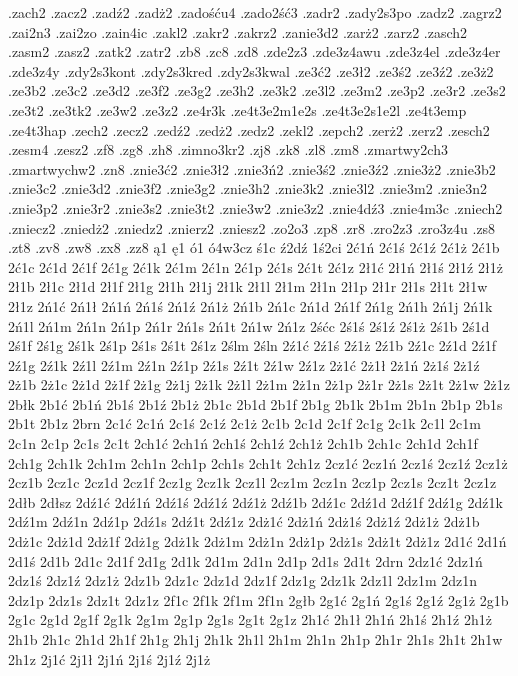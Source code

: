 {.zach2
.zacz2
.zadź2
.zadż2
.zadośću4
.zado2ść3
.zadr2
.zady2s3po
.zadz2
.zagrz2
.zai2n3
.zai2zo
.zain4ic
.zakl2
.zakr2
.zakrz2
.zanie3d2
.zarż2
.zarz2
.zasch2
.zasm2
.zasz2
.zatk2
.zatr2
.zb8
.zc8
.zd8
.zde2z3
.zde3z4awu
.zde3z4el
.zde3z4er
.zde3z4y
.zdy2s3kont
.zdy2s3kred
.zdy2s3kwal
.ze3ć2
.ze3ł2
.ze3ś2
.ze3ź2
.ze3ż2
.ze3b2
.ze3c2
.ze3d2
.ze3f2
.ze3g2
.ze3h2
.ze3k2
.ze3l2
.ze3m2
.ze3p2
.ze3r2
.ze3s2
.ze3t2
.ze3tk2
.ze3w2
.ze3z2
.ze4r3k
.ze4t3e2m1e2s
.ze4t3e2s1e2l
.ze4t3emp
.ze4t3hap
.zech2
.zecz2
.zedź2
.zedż2
.zedz2
.zekl2
.zepch2
.zerż2
.zerz2
.zesch2
.zesm4
.zesz2
.zf8
.zg8
.zh8
.zimno3kr2
.zj8
.zk8
.zl8
.zm8
.zmartwy2ch3
.zmartwychw2
.zn8
.znie3ć2
.znie3ł2
.znie3ń2
.znie3ś2
.znie3ź2
.znie3ż2
.znie3b2
.znie3c2
.znie3d2
.znie3f2
.znie3g2
.znie3h2
.znie3k2
.znie3l2
.znie3m2
.znie3n2
.znie3p2
.znie3r2
.znie3s2
.znie3t2
.znie3w2
.znie3z2
.znie4dź3
.znie4m3c
.zniech2
.zniecz2
.zniedż2
.zniedz2
.znierz2
.zniesz2
.zo2o3
.zp8
.zr8
.zro2z3
.zro3z4u
.zs8
.zt8
.zv8
.zw8
.zx8
.zz8
ą1
ę1
ó1
ó4w3cz
ś1c
ź2dź
1ś2ci
2ć1ń
2ć1ś
2ć1ź
2ć1ż
2ć1b
2ć1c
2ć1d
2ć1f
2ć1g
2ć1k
2ć1m
2ć1n
2ć1p
2ć1s
2ć1t
2ć1z
2ł1ć
2ł1ń
2ł1ś
2ł1ź
2ł1ż
2ł1b
2ł1c
2ł1d
2ł1f
2ł1g
2ł1h
2ł1j
2ł1k
2ł1l
2ł1m
2ł1n
2ł1p
2ł1r
2ł1s
2ł1t
2ł1w
2ł1z
2ń1ć
2ń1ł
2ń1ń
2ń1ś
2ń1ź
2ń1ż
2ń1b
2ń1c
2ń1d
2ń1f
2ń1g
2ń1h
2ń1j
2ń1k
2ń1l
2ń1m
2ń1n
2ń1p
2ń1r
2ń1s
2ń1t
2ń1w
2ń1z
2śćc
2ś1ś
2ś1ź
2ś1ż
2ś1b
2ś1d
2ś1f
2ś1g
2ś1k
2ś1p
2ś1s
2ś1t
2ś1z
2ślm
2śln
2ź1ć
2ź1ś
2ź1ż
2ź1b
2ź1c
2ź1d
2ź1f
2ź1g
2ź1k
2ź1l
2ź1m
2ź1n
2ź1p
2ź1s
2ź1t
2ź1w
2ź1z
2ż1ć
2ż1ł
2ż1ń
2ż1ś
2ż1ź
2ż1b
2ż1c
2ż1d
2ż1f
2ż1g
2ż1j
2ż1k
2ż1l
2ż1m
2ż1n
2ż1p
2ż1r
2ż1s
2ż1t
2ż1w
2ż1z
2błk
2b1ć
2b1ń
2b1ś
2b1ź
2b1ż
2b1c
2b1d
2b1f
2b1g
2b1k
2b1m
2b1n
2b1p
2b1s
2b1t
2b1z
2brn
2c1ć
2c1ń
2c1ś
2c1ź
2c1ż
2c1b
2c1d
2c1f
2c1g
2c1k
2c1l
2c1m
2c1n
2c1p
2c1s
2c1t
2ch1ć
2ch1ń
2ch1ś
2ch1ź
2ch1ż
2ch1b
2ch1c
2ch1d
2ch1f
2ch1g
2ch1k
2ch1m
2ch1n
2ch1p
2ch1s
2ch1t
2ch1z
2cz1ć
2cz1ń
2cz1ś
2cz1ź
2cz1ż
2cz1b
2cz1c
2cz1d
2cz1f
2cz1g
2cz1k
2cz1l
2cz1m
2cz1n
2cz1p
2cz1s
2cz1t
2cz1z
2dłb
2dłsz
2dź1ć
2dź1ń
2dź1ś
2dź1ź
2dź1ż
2dź1b
2dź1c
2dź1d
2dź1f
2dź1g
2dź1k
2dź1m
2dź1n
2dź1p
2dź1s
2dź1t
2dź1z
2dż1ć
2dż1ń
2dż1ś
2dż1ź
2dż1ż
2dż1b
2dż1c
2dż1d
2dż1f
2dż1g
2dż1k
2dż1m
2dż1n
2dż1p
2dż1s
2dż1t
2dż1z
2d1ć
2d1ń
2d1ś
2d1b
2d1c
2d1f
2d1g
2d1k
2d1m
2d1n
2d1p
2d1s
2d1t
2drn
2dz1ć
2dz1ń
2dz1ś
2dz1ź
2dz1ż
2dz1b
2dz1c
2dz1d
2dz1f
2dz1g
2dz1k
2dz1l
2dz1m
2dz1n
2dz1p
2dz1s
2dz1t
2dz1z
2f1c
2f1k
2f1m
2f1n
2głb
2g1ć
2g1ń
2g1ś
2g1ź
2g1ż
2g1b
2g1c
2g1d
2g1f
2g1k
2g1m
2g1p
2g1s
2g1t
2g1z
2h1ć
2h1ł
2h1ń
2h1ś
2h1ź
2h1ż
2h1b
2h1c
2h1d
2h1f
2h1g
2h1j
2h1k
2h1l
2h1m
2h1n
2h1p
2h1r
2h1s
2h1t
2h1w
2h1z
2j1ć
2j1ł
2j1ń
2j1ś
2j1ź
2j1ż
}
